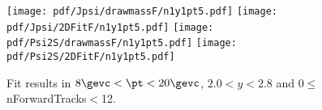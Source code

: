 \begin{figure}[H]
\begin{center}
\texttt{[image: pdf/Jpsi/drawmassF/n1y1pt5.pdf]}
\texttt{[image: pdf/Jpsi/2DFitF/n1y1pt5.pdf]}
\vspace*{-0.5cm}
\texttt{[image: pdf/Psi2S/drawmassF/n1y1pt5.pdf]}
\texttt{[image: pdf/Psi2S/2DFitF/n1y1pt5.pdf]}
\vspace*{-0.5cm}
\end{center}
\caption{Fit results in $8\gevc<\pt<20\gevc$, $2.0<y<2.8$ and 0$\leq$nForwardTracks$<$12.}
\label{Fitn1y1pt5}
\end{figure}
